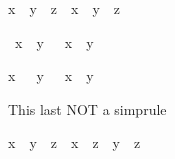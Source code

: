 \begin{isabellebody}
\begin{isamarkuptext}
\begin{isabelle}%
x\ {\isacharslash}\ y\ {\isacharslash}\ z\ {\isacharequal}\ x\ {\isacharslash}\ {\isacharparenleft}y\ {\isacharasterisk}\ z{\isacharparenright}%
\end{isabelle}

\begin{isabelle}%
{\isacharminus}\ x\ {\isacharslash}\ y\ {\isacharequal}\ {\isacharminus}\ {\isacharparenleft}x\ {\isacharslash}\ y{\isacharparenright}%
\end{isabelle}

\begin{isabelle}%
x\ {\isacharslash}\ {\isacharminus}\ y\ {\isacharequal}\ {\isacharminus}\ {\isacharparenleft}x\ {\isacharslash}\ y{\isacharparenright}%
\end{isabelle}

This last NOT a simprule

\begin{isabelle}%
{\isacharparenleft}x\ {\isacharplus}\ y{\isacharparenright}\ {\isacharslash}\ z\ {\isacharequal}\ x\ {\isacharslash}\ z\ {\isacharplus}\ y\ {\isacharslash}\ z%
\end{isabelle}
%
\end{isamarkuptext}%
\isanewline
\end{isabellebody}%
